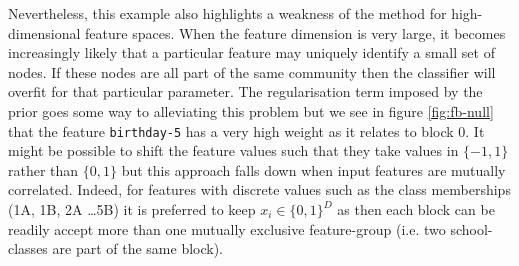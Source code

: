 Nevertheless, this example also highlights a weakness of the method for high-dimensional feature spaces. When the feature dimension is very large, it becomes increasingly likely that a particular feature may uniquely identify a small set of nodes. If these nodes are all part of the same community then the classifier will overfit for that particular parameter. The regularisation term imposed by the prior goes some way to alleviating this problem but we see in figure \ref{fig:fb-null} that the feature \verb*|birthday-5| has a very high weight as it relates to block 0. It might be possible to shift the feature values such that they take values in $\{-1, 1\}$ rather than $\{0, 1\}$ but this approach falls down when input features are mutually correlated. Indeed, for features with discrete values such as the class memberships (1A, 1B, 2A \dots 5B) it is preferred to keep $x_i \in \{0, 1\}^D$ as then each block can be readily accept more than one mutually exclusive feature-group (i.e. two school-classes are part of the same block).

